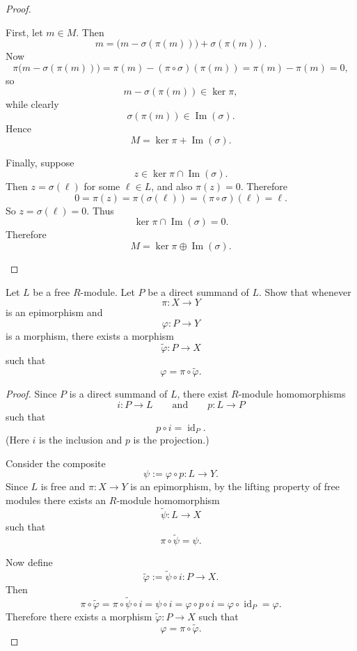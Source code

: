 \begin{proof}
\begin{enumerate}
              First, let $m\in M$. Then
              \[
                  m=\bigl(m-\sigma(\pi(m))\bigr)+\sigma(\pi(m)).
              \]
              Now
              \[
                  \pi\bigl(m-\sigma(\pi(m))\bigr)
                  =\pi(m)-(\pi\circ \sigma)(\pi(m))
                  =\pi(m)-\pi(m)=0,
              \]
              so
              \[
                  m-\sigma(\pi(m))\in \ker \pi,
              \]
              while clearly
              \[
                  \sigma(\pi(m))\in \operatorname{Im}(\sigma).
              \]
              Hence
              \[
                  M=\ker \pi+\operatorname{Im}(\sigma).
              \]

              Finally, suppose
              \[
                  z\in \ker \pi \cap \operatorname{Im}(\sigma).
              \]
              Then $z=\sigma(\ell)$ for some $\ell\in L$, and also $\pi(z)=0$. Therefore
              \[
                  0=\pi(z)=\pi(\sigma(\ell))=(\pi\circ \sigma)(\ell)=\ell.
              \]
              So $z=\sigma(\ell)=0$. Thus
              \[
                  \ker \pi \cap \operatorname{Im}(\sigma)=0.
              \]
              Therefore
              \[
                  M=\ker \pi \oplus \operatorname{Im}(\sigma).
              \]
    \end{enumerate}
\end{proof}

\begin{exercise}
    Let $L$ be a free $R$-module. Let $P$ be a direct summand of $L$. Show that whenever
    \[
        \pi:X\to Y
    \]
    is an epimorphism and
    \[
        \varphi:P\to Y
    \]
    is a morphism, there exists a morphism
    \[
        \tilde{\varphi}:P\to X
    \]
    such that
    \[
        \varphi=\pi\circ \tilde{\varphi}.
    \]
\end{exercise}

\begin{proof}
    Since $P$ is a direct summand of $L$, there exist $R$-module homomorphisms
    \[
        i:P\to L
        \qquad\text{and}\qquad
        p:L\to P
    \]
    such that
    \[
        p\circ i=\operatorname{id}_P.
    \]
    (Here $i$ is the inclusion and $p$ is the projection.)

    Consider the composite
    \[
        \psi:=\varphi\circ p:L\to Y.
    \]
    Since $L$ is free and $\pi:X\to Y$ is an epimorphism, by the lifting property of free modules there exists an $R$-module homomorphism
    \[
        \widetilde{\psi}:L\to X
    \]
    such that
    \[
        \pi\circ \widetilde{\psi}=\psi.
    \]

    Now define
    \[
        \widetilde{\varphi}:=\widetilde{\psi}\circ i:P\to X.
    \]
    Then
    \[
        \pi\circ \widetilde{\varphi}
        =\pi\circ \widetilde{\psi}\circ i
        =\psi\circ i
        =\varphi\circ p\circ i
        =\varphi\circ \operatorname{id}_P
        =\varphi.
    \]
    Therefore there exists a morphism $\widetilde{\varphi}:P\to X$ such that
    \[
        \varphi=\pi\circ \widetilde{\varphi}.
    \]
\end{proof}

